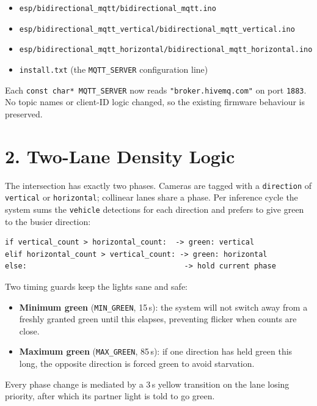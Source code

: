 \documentclass[11pt]{article}
\begin{document}
\begin{itemize}[nosep]
  \item \texttt{esp/bidirectional\_mqtt/bidirectional\_mqtt.ino}
  \item \texttt{esp/bidirectional\_mqtt\_vertical/bidirectional\_mqtt\_vertical.ino}
  \item \texttt{esp/bidirectional\_mqtt\_horizontal/bidirectional\_mqtt\_horizontal.ino}
  \item \texttt{install.txt} (the \texttt{MQTT\_SERVER} configuration line)
\end{itemize}

\noindent Each \texttt{const char* MQTT\_SERVER} now reads
\texttt{"broker.hivemq.com"} on port \texttt{1883}. No topic names or client-ID
logic changed, so the existing firmware behaviour is preserved.

\section{2. Two-Lane Density Logic}
The intersection has exactly two phases. Cameras are tagged with a
\texttt{direction} of \texttt{vertical} or \texttt{horizontal}; collinear lanes
share a phase. Per inference cycle the system sums the \texttt{vehicle}
detections for each direction and prefers to give green to the busier
direction:

\begin{lstlisting}
if vertical_count > horizontal_count:  -> green: vertical
elif horizontal_count > vertical_count: -> green: horizontal
else:                                    -> hold current phase
\end{lstlisting}

\noindent Two timing guards keep the lights sane and safe:
\begin{itemize}[nosep]
  \item \textbf{Minimum green} (\texttt{MIN\_GREEN}, 15\,s): the system will not
        switch away from a freshly granted green until this elapses, preventing
        flicker when counts are close.
  \item \textbf{Maximum green} (\texttt{MAX\_GREEN}, 85\,s): if one direction has
        held green this long, the opposite direction is forced green to avoid
        starvation.
\end{itemize}

\noindent Every phase change is mediated by a 3\,s yellow transition on the
lane losing priority, after which its partner light is told to go green.
\end{document}
